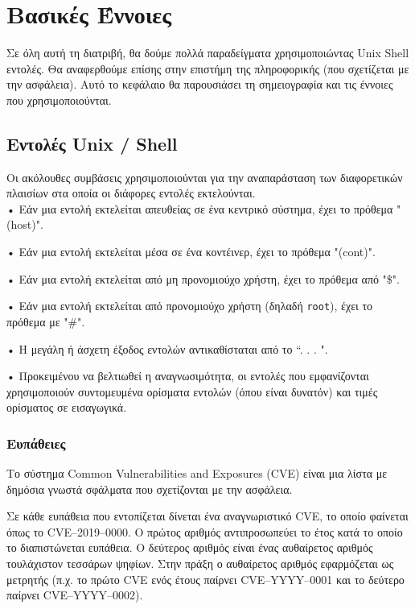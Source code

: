 \chapter{Βασικές Έννοιες}
\label{basicConcepts}

Σε όλη αυτή τη διατριβή, θα δούμε πολλά παραδείγματα χρησιμοποιώντας
\textlatin{Unix Shell} εντολές. Θα αναφερθούμε επίσης στην επιστήμη της
πληροφορικής (που σχετίζεται με την ασφάλεια). Αυτό το κεφάλαιο θα παρουσιάσει
τη σημειογραφία και τις έννοιες που χρησιμοποιούνται.

\section{Εντολές \textlatin{Unix / Shell}}

Οι ακόλουθες συμβάσεις χρησιμοποιούνται για την αναπαράσταση των διαφορετικών
πλαισίων στα οποία οι διάφορες εντολές εκτελούνται. \\

• Εάν μια εντολή εκτελείται απευθείας σε ένα κεντρικό σύστημα, έχει το πρόθεμα
"(\textlatin{host})".

• Εάν μια εντολή εκτελείται μέσα σε ένα κοντέινερ, έχει το πρόθεμα
"(\textlatin{cont})".

• Εάν μια εντολή εκτελείται από μη προνομιούχο χρήστη, έχει το πρόθεμα από
"\$".

• Εάν μια εντολή εκτελείται από προνομιούχο χρήστη (δηλαδή 
\texttt{\textlatin{root}}), έχει το πρόθεμα με "\#".

• Η μεγάλη ή άσχετη έξοδος εντολών αντικαθίσταται από το “. . . ".

• Προκειμένου να βελτιωθεί η αναγνωσιμότητα, οι εντολές που εμφανίζονται
χρησιμοποιούν συντομευμένα ορίσματα εντολών (όπου είναι δυνατόν) και τιμές
ορίσματος σε εισαγωγικά.

\subsection{Ευπάθειες}

Το σύστημα \textlatin{Common Vulnerabilities and Exposures (CVE)} είναι μια
λίστα με δημόσια γνωστά σφάλματα που σχετίζονται με την ασφάλεια.

Σε κάθε ευπάθεια που εντοπίζεται δίνεται ένα αναγνωριστικό \textlatin{CVE}, το
οποίο φαίνεται όπως το \textlatin{CVE–2019–0000}. Ο πρώτος αριθμός
αντιπροσωπεύει το έτος κατά το οποίο το διαπιστώνεται ευπάθεια. Ο δεύτερος
αριθμός είναι ένας αυθαίρετος αριθμός τουλάχιστον τεσσάρων ψηφίων. Στην πράξη ο
αυθαίρετος αριθμός εφαρμόζεται ως μετρητής (π.χ. το πρώτο \textlatin{CVE} ενός
έτους παίρνει \textlatin{CVE–YYYY–0001} και το δεύτερο παίρνει
\textlatin{CVE–YYYY–0002)}.

